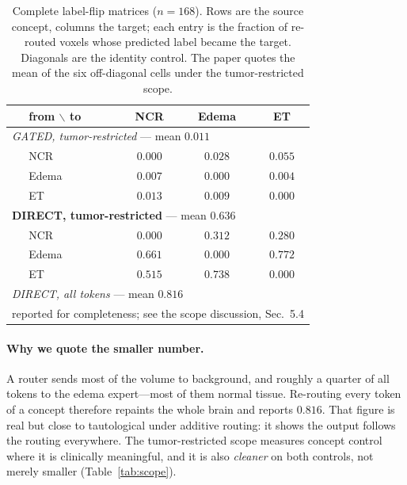 \documentclass[10pt,twocolumn,letterpaper]{article}
\begin{document}
\begin{table}[t]\centering\footnotesize
\setlength{\tabcolsep}{4pt}
\caption{Complete label-flip matrices ($n{=}168$). Rows are the source concept, columns the
target; each entry is the fraction of re-routed voxels whose predicted label became the
target. Diagonals are the identity control. The paper quotes the mean of the six
off-diagonal cells under the tumor-restricted scope.}
\label{tab:fullmatrix}
\begin{tabular}{llccc}
\toprule
& from $\backslash$ to & NCR & Edema & ET \\
\midrule
\multicolumn{5}{l}{\emph{GATED, tumor-restricted} --- mean $0.011$}\\
& NCR   & $0.000$ & $0.028$ & $0.055$ \\
& Edema & $0.007$ & $0.000$ & $0.004$ \\
& ET    & $0.013$ & $0.009$ & $0.000$ \\
\midrule
\multicolumn{5}{l}{\textbf{DIRECT, tumor-restricted} --- mean $\mathbf{0.636}$}\\
& NCR   & $0.000$ & $0.312$ & $0.280$ \\
& Edema & $0.661$ & $0.000$ & $0.772$ \\
& ET    & $0.515$ & $0.738$ & $0.000$ \\
\midrule
\multicolumn{5}{l}{\emph{DIRECT, all tokens} --- mean $0.816$}\\
\multicolumn{5}{l}{\footnotesize reported for completeness; see the scope discussion, Sec.~5.4}\\
\bottomrule
\end{tabular}
\end{table}

\paragraph{Why we quote the smaller number.}
A router sends most of the volume to background, and roughly a quarter of all tokens to the
edema expert---most of them normal tissue. Re-routing every token of a concept therefore
repaints the whole brain and reports $0.816$. That figure is real but close to tautological
under additive routing: it shows the output follows the routing everywhere. The
tumor-restricted scope measures concept control where it is clinically meaningful, and it is
also \emph{cleaner} on both controls, not merely smaller (Table~\ref{tab:scope}).
\end{document}
